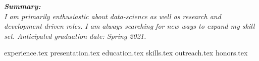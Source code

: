 \documentclass[11pt, a4paper]{awesome-cv}
\newcommand*{\sectiondir}{cv/}
\begin{document}
\makecvheader

\vspace{1.0mm}
\begin{justify}
\bodyfont\itshape\color{darktext}
\textbf{Summary:} \\ 
I am primarily enthusiastic about data-science as well as research and development driven roles. I am always searching for new ways to expand my skill set. 
Anticipated graduation date: Spring 2021.
\end{justify}
\vspace{1.0mm}

{experience.tex}
{presentation.tex}
{education.tex} 
{skills.tex} 
\vspace{3.0mm}
{outreach.tex}
\vspace{3.0mm}
{honors.tex}
\end{document}
